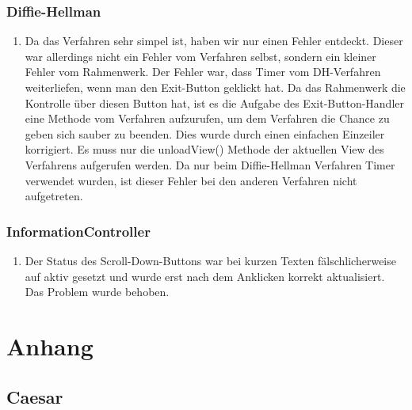 \documentclass{article}
\begin{document}
     \subsubsection{Diffie-Hellman}
     \begin{enumerate}
         \item Da das Verfahren sehr simpel ist, haben wir nur einen Fehler entdeckt.
             Dieser war allerdings nicht ein Fehler vom Verfahren selbst, sondern
             ein kleiner Fehler vom Rahmenwerk. Der Fehler war, dass Timer vom DH-Verfahren weiterliefen,
             wenn man den Exit-Button geklickt hat. Da das Rahmenwerk die Kontrolle über diesen Button
             hat, ist es die Aufgabe des Exit-Button-Handler eine Methode vom Verfahren aufzurufen,
             um dem Verfahren die Chance zu geben sich sauber zu beenden. Dies wurde
             durch einen einfachen Einzeiler korrigiert. Es muss nur die unloadView() Methode der aktuellen
             View des Verfahrens aufgerufen werden.
             Da nur beim Diffie-Hellman Verfahren Timer verwendet wurden, ist dieser
             Fehler bei den anderen Verfahren nicht aufgetreten.
         \end{enumerate}

    \subsubsection{InformationController}
     \begin{enumerate}
         \item Der Status des Scroll-Down-Buttons war bei kurzen Texten fälschlicherweise auf aktiv gesetzt
         und wurde erst nach dem Anklicken korrekt aktualisiert. Das Problem wurde behoben.
         \end{enumerate}


\section{Anhang}
 \subsection{Caesar}
\end{document}
